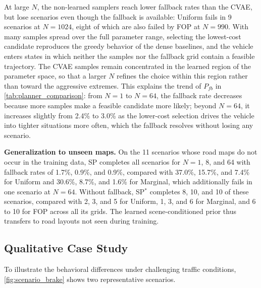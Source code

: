 At large $N$, the non-learned samplers reach lower fallback rates than the CVAE, but lose scenarios even though the fallback is available: Uniform fails in 9 scenarios at $N=1024$, eight of which are also failed by FOP at $N=990$.
With many samples spread over the full parameter range, selecting the lowest-cost candidate reproduces the greedy behavior of the dense baselines, and the vehicle enters states in which neither the samples nor the fallback grid contain a feasible trajectory.
The CVAE samples remain concentrated in the learned region of the parameter space, so that a larger $N$ refines the choice within this region rather than toward the aggressive extremes.
This explains the trend of $P_{fb}$ in \autoref{tab:planner_comparison}: from $N=1$ to $N=64$, the fallback rate decreases because more samples make a feasible candidate more likely; beyond $N=64$, it increases slightly from 2.4\% to 3.0\% as the lower-cost selection drives the vehicle into tighter situations more often, which the fallback resolves without losing any scenario.

\textbf{Generalization to unseen maps.}
On the 11 scenarios whose road maps do not occur in the training data, SP completes all scenarios for $N=1$, 8, and 64 with fallback rates of 1.7\%, 0.9\%, and 0.9\%, compared with 37.0\%, 15.7\%, and 7.4\% for Uniform and 30.6\%, 8.7\%, and 1.6\% for Marginal, which additionally fails in one scenario at $N=64$.
Without fallback, SP$^{*}$ completes 8, 10, and 10 of these scenarios, compared with 2, 3, and 5 for Uniform, 1, 3, and 6 for Marginal, and 6 to 10 for FOP across all its grids.
The learned scene-conditioned prior thus transfers to road layouts not seen during training.

\subsection{Qualitative Case Study}
\label{subsec:case_study}
To illustrate the behavioral differences under challenging traffic conditions, \autoref{fig:scenario_brake} shows two representative scenarios.

